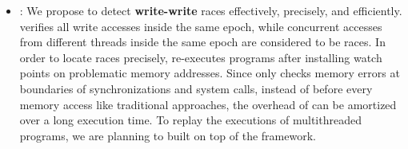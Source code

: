 \begin{itemize}




\item \stopgap{}:
We propose \stopgap{} to detect \textbf{write-write} races effectively, precisely, and efficiently.
\stopgap{} verifies all write accesses inside the same epoch, while 
concurrent accesses from different threads inside the same epoch are considered
to be races. In order to locate races precisely, \stopgap{} re-executes programs after installing 
watch points on problematic memory addresses. 
Since \stopgap{} only checks memory errors at boundaries of synchronizations and system calls,
instead of before every memory access like traditional approaches, 
the overhead of \stopgap{} can be amortized over a long execution time. 
To replay the executions of  multithreaded programs, we
are planning to built \stopgap{} on top of the \dthreads{} framework.
  


\end{itemize}
